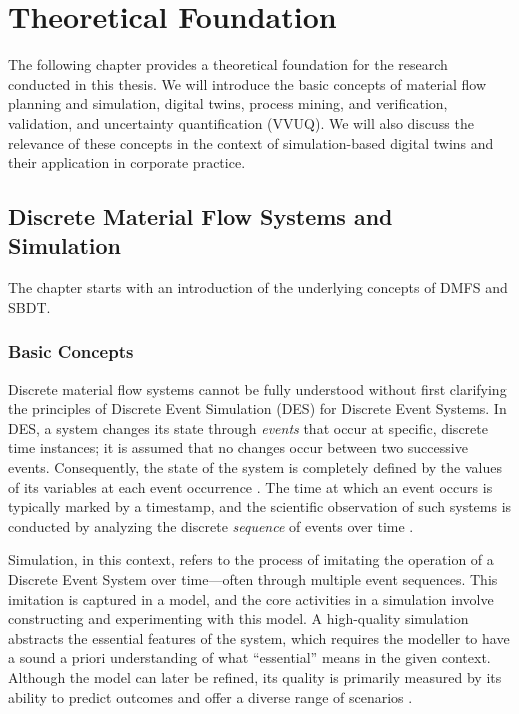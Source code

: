 \chapter{Theoretical Foundation}
\label{chap:theory}

The following chapter provides a theoretical foundation for the research conducted in this thesis. We will introduce the basic concepts of material flow planning and simulation, digital twins, process mining, and verification, validation, and uncertainty quantification (VVUQ). We will also discuss the relevance of these concepts in the context of simulation-based digital twins and their application in corporate practice.


\section{Discrete Material Flow Systems and Simulation}
The chapter starts with an introduction of the underlying concepts of DMFS and SBDT.
\label{sec:material-flow}
\subsection{Basic Concepts}
Discrete material flow systems cannot be fully understood without first clarifying the principles of Discrete Event Simulation (DES) for Discrete Event Systems. In DES, a system changes its state through \textit{events} that occur at specific, discrete time instances; it is assumed that no changes occur between two successive events. Consequently, the state of the system is completely defined by the values of its variables at each event occurrence \parencite{varga2001discrete}. The time at which an event occurs is typically marked by a timestamp, and the scientific observation of such systems is conducted by analyzing the discrete \textit{sequence} of events over time \parencite{robinson2014simulation}.

Simulation, in this context, refers to the process of imitating the operation of a Discrete Event System over time—often through multiple event sequences. This imitation is captured in a model, and the core activities in a simulation involve constructing and experimenting with this model. A high-quality simulation abstracts the essential features of the system, which requires the modeller to have a sound a priori understanding of what “essential” means in the given context. Although the model can later be refined, its quality is primarily measured by its ability to predict outcomes and offer a diverse range of scenarios \parencite{maria1997introduction}.

